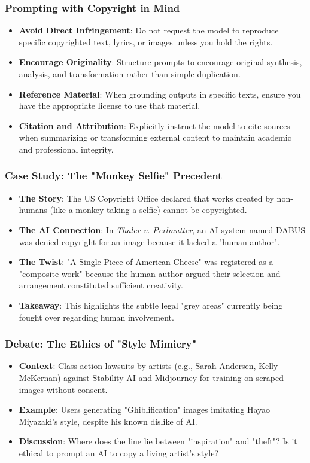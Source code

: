\documentclass{beamer}
\begin{document}
\begin{frame}
    \frametitle{Prompting with Copyright in Mind}
    \begin{itemize}
        \item \textbf{Avoid Direct Infringement}: Do not request the model to reproduce specific copyrighted text, lyrics, or images unless you hold the rights.
        \item \textbf{Encourage Originality}: Structure prompts to encourage original synthesis, analysis, and transformation rather than simple duplication.
        \item \textbf{Reference Material}: When grounding outputs in specific texts, ensure you have the appropriate license to use that material.
        \item \textbf{Citation and Attribution}: Explicitly instruct the model to cite sources when summarizing or transforming external content to maintain academic and professional integrity.
    \end{itemize}
\end{frame}

\begin{frame}
    \frametitle{Case Study: The "Monkey Selfie" Precedent}
    \begin{itemize}
        \item \textbf{The Story}: The US Copyright Office declared that works created by non-humans (like a monkey taking a selfie) cannot be copyrighted.
        \item \textbf{The AI Connection}: In \textit{Thaler v. Perlmutter}, an AI system named DABUS was denied copyright for an image because it lacked a "human author".
        \item \textbf{The Twist}: "A Single Piece of American Cheese" was registered as a "composite work" because the human author argued their selection and arrangement constituted sufficient creativity.
        \item \textbf{Takeaway}: This highlights the subtle legal "grey areas" currently being fought over regarding human involvement.
    \end{itemize}
\end{frame}

\begin{frame}
    \frametitle{Debate: The Ethics of "Style Mimicry"}
    \begin{itemize}
        \item \textbf{Context}: Class action lawsuits by artists (e.g., Sarah Andersen, Kelly McKernan) against Stability AI and Midjourney for training on scraped images without consent.
        \item \textbf{Example}: Users generating "Ghiblification" images imitating Hayao Miyazaki’s style, despite his known dislike of AI.
        \item \textbf{Discussion}: Where does the line lie between "inspiration" and "theft"? Is it ethical to prompt an AI to copy a living artist's style?
    \end{itemize}
\end{frame}
\end{document}
